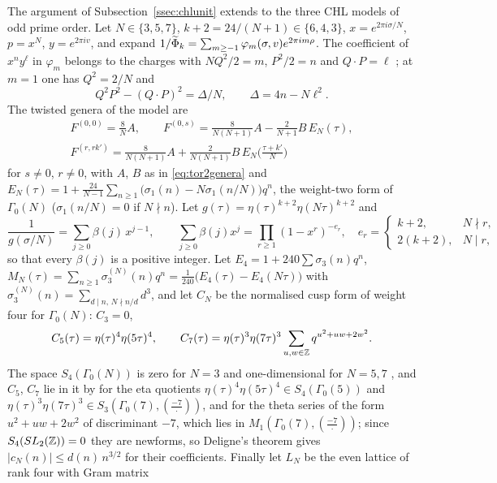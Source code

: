 The argument of Subsection~\ref{ssec:chlunit} extends to the three CHL models of odd prime order. Let $N\in\{3,5,7\}$, $k+2=24/(N+1)\in\{6,4,3\}$, $x=e^{2\pi i\sigma/N}$, $p=x^N$, $y=e^{2\pi iv}$, and expand $1/\widetilde{\Phi}_k=\sum_{m\ge-1}\varphi_m(\sigma,v)e^{2\pi im\rho}$. The coefficient of $x^ny^\ell$ in $\varphi_m$ belongs to the charges with $NQ^2/2=m$, $P^2/2=n$ and $Q\cdot P=\ell$ \cite[Theorem~5.4]{BSS25}; at $m=1$ one has $Q^2=2/N$ and
\[
Q^2P^2-(Q\cdot P)^2=\Delta/N,\qquad \Delta=4n-N\ell^2 .
\]
The twisted genera of the model are \cite{DJS06}
\[
\begin{gathered}
F^{(0,0)}=\tfrac8NA,\qquad F^{(0,s)}=\tfrac8{N(N+1)}A-\tfrac2{N+1}B\,E_N(\tau),\\
F^{(r,rk')}=\tfrac8{N(N+1)}A+\tfrac2{N(N+1)}B\,E_N\big(\tfrac{\tau+k'}N\big)
\end{gathered}
\]
\enlargethispage{2pt}
for $s\ne0$, $r\ne0$, with $A$, $B$ as in \eqref{eq:tor2genera} and $E_N(\tau)=1+\frac{24}{N-1}\sum_{n\ge1}\big(\sigma_1(n)-N\sigma_1(n/N)\big)q^n$, the weight-two form of $\Gamma_0(N)$ ($\sigma_1(n/N)=0$ if $N\nmid n$). Let $g(\tau)=\eta(\tau)^{k+2}\eta(N\tau)^{k+2}$ and
\[
\frac1{g(\sigma/N)}=\sum_{j\ge0}\beta(j)\,x^{j-1},\qquad \sum_{j\ge0}\beta(j)x^j=\prod_{r\ge1}(1-x^r)^{-e_r},\quad e_r=\begin{cases}k+2,&N\nmid r,\\2(k+2),&N\mid r,\end{cases}
\]
so that every $\beta(j)$ is a positive integer. Let $E_4=1+240\sum\sigma_3(n)q^n$, $M_N(\tau)=\sum_{n\ge1}\sigma_3^{(N)}(n)q^n=\frac1{240}\big(E_4(\tau)-E_4(N\tau)\big)$ with $\sigma_3^{(N)}(n)=\sum_{d\mid n,\,N\nmid n/d}d^3$, and let $C_N$ be the normalised cusp form of weight four for $\Gamma_0(N)$: $C_3=0$,
\[
C_5(\tau)=\eta(\tau)^4\eta(5\tau)^4,\qquad C_7(\tau)=\eta(\tau)^3\eta(7\tau)^3\sum_{u,w\in\mathbb{Z}}q^{u^2+uw+2w^2}.
\]
The space $S_4(\Gamma_0(N))$ is zero for $N=3$ and one-dimensional for $N=5,7$ \cite[Theorem~3.5.1]{DiamondShurman05}, and $C_5$, $C_7$ lie in it by \cite[Theorems~1.64 and~1.65]{Ono04} for the eta quotients $\eta(\tau)^4\eta(5\tau)^4\in S_4(\Gamma_0(5))$ and $\eta(\tau)^3\eta(7\tau)^3\in S_3(\Gamma_0(7),(\frac{-7}\cdot))$, and \cite[Theorem~10.9]{Iwaniec97} for the theta series of the form $u^2+uw+2w^2$ of discriminant $-7$, which lies in $M_1(\Gamma_0(7),(\frac{-7}\cdot))$; since $S_4(SL_2(\mathbb{Z}))=0$ they are newforms, so Deligne's theorem \cite{Deligne74} gives $|c_N(n)|\le d(n)\,n^{3/2}$ for their coefficients. Finally let $L_N$ be the even lattice of rank four with Gram matrix
